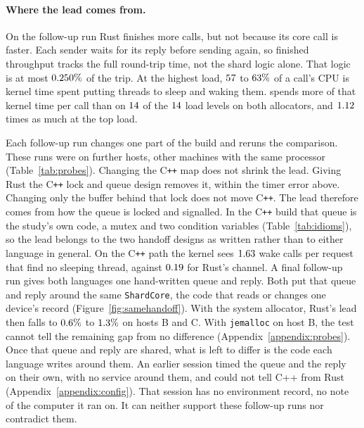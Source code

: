 \documentclass[english,oneside,a4paper,censored,csm,software-track-2020]{HYthesisML}
\begin{document}
\paragraph{Where the lead comes from.}
On the follow-up run Rust finishes more calls, but not because its core call is
faster. Each sender waits for its reply before sending again, so finished
throughput tracks the full round-trip time, not the shard logic alone. That logic is at most
$0.250\%$ of the trip. At the highest load, $57$
to $63\%$ of a call's CPU is kernel time spent putting
threads to sleep and waking them. \ProbeAfterSysHigher{} spends more of that
kernel time per call than \ProbeAfterSysLower{} on $14$
of the $14$ load levels on both allocators, and
$1.12$ times as much at the top load.

Each follow-up run changes one part of the build and reruns the comparison.
These runs were on further hosts, other machines with the same processor
(Table~\ref{tab:probes}). Changing the C\texttt{++} map does
not shrink the lead. Giving Rust the C\texttt{++} lock and queue design
removes it, within the timer error above. Changing only the buffer behind that
lock does not move C\texttt{++}. The lead therefore comes from how the queue is
locked and signalled. In the C\texttt{++} build that queue is the study's own
code, a mutex and two condition variables (Table~\ref{tab:idioms}), so the lead
belongs to the two handoff designs as written rather than to either language in
general. On the C\texttt{++} path the kernel sees $1.63$
wake calls per request that find no sleeping thread, against
$0.19$ for Rust's channel. A final follow-up run gives both languages one hand-written queue and reply.
Both put that queue and reply around the same \texttt{ShardCore}, the code
that reads or changes one device's record (Figure~\ref{fig:samehandoff}). With
the system allocator, Rust's lead then falls to $0.6\%$ to
$1.3\%$ on hosts B and C. With \texttt{jemalloc} on host B, the
test cannot tell the remaining gap from no difference
(Appendix~\ref{appendix:probes}). Once that queue and reply are shared, what
is left to differ is the code each language writes around them. An earlier
session timed the queue and the reply on their own, with no service around
them, and could not tell C++ from Rust (Appendix~\ref{appendix:config}). That
session has no environment record, no note of the computer it ran on. It can
neither support these follow-up runs nor contradict them.
\end{document}
